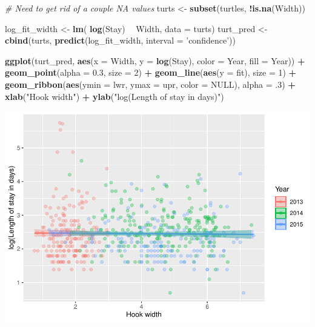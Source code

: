 \documentclass[
]{book}
\newenvironment{Shaded}{\begin{snugshade}}{\end{snugshade}}
\newcommand{\CommentTok}[1]{\textcolor[rgb]{0.56,0.35,0.01}{\textit{#1}}}
\newcommand{\DataTypeTok}[1]{\textcolor[rgb]{0.13,0.29,0.53}{#1}}
\newcommand{\DecValTok}[1]{\textcolor[rgb]{0.00,0.00,0.81}{#1}}
\newcommand{\FloatTok}[1]{\textcolor[rgb]{0.00,0.00,0.81}{#1}}
\newcommand{\KeywordTok}[1]{\textcolor[rgb]{0.13,0.29,0.53}{\textbf{#1}}}
\newcommand{\NormalTok}[1]{#1}
\newcommand{\OperatorTok}[1]{\textcolor[rgb]{0.81,0.36,0.00}{\textbf{#1}}}
\newcommand{\OtherTok}[1]{\textcolor[rgb]{0.56,0.35,0.01}{#1}}
\newcommand{\StringTok}[1]{\textcolor[rgb]{0.31,0.60,0.02}{#1}}
\begin{document}
\begin{Shaded}
\begin{Highlighting}[]
\CommentTok{# Need to get rid of a couple NA values}
\NormalTok{turts <-}\StringTok{ }\KeywordTok{subset}\NormalTok{(turtles, }\OperatorTok{!}\KeywordTok{is.na}\NormalTok{(Width))}

\NormalTok{log_fit_width <-}\StringTok{ }\KeywordTok{lm}\NormalTok{( }\KeywordTok{log}\NormalTok{(Stay) }\OperatorTok{~}\StringTok{ }\NormalTok{Width, }\DataTypeTok{data =}\NormalTok{ turts)}
\NormalTok{turt_pred <-}\StringTok{ }\KeywordTok{cbind}\NormalTok{(turts, }\KeywordTok{predict}\NormalTok{(log_fit_width, }\DataTypeTok{interval =} \StringTok{'confidence'}\NormalTok{))}

\KeywordTok{ggplot}\NormalTok{(turt_pred, }\KeywordTok{aes}\NormalTok{(}\DataTypeTok{x =}\NormalTok{ Width, }\DataTypeTok{y =} \KeywordTok{log}\NormalTok{(Stay), }\DataTypeTok{color =}\NormalTok{ Year, }\DataTypeTok{fill =}\NormalTok{ Year)) }\OperatorTok{+}
\StringTok{  }\KeywordTok{geom_point}\NormalTok{(}\DataTypeTok{alpha =} \FloatTok{0.3}\NormalTok{, }\DataTypeTok{size =} \DecValTok{2}\NormalTok{) }\OperatorTok{+}
\StringTok{  }\KeywordTok{geom_line}\NormalTok{(}\KeywordTok{aes}\NormalTok{(}\DataTypeTok{y =}\NormalTok{ fit), }\DataTypeTok{size =} \DecValTok{1}\NormalTok{) }\OperatorTok{+}
\StringTok{  }\KeywordTok{geom_ribbon}\NormalTok{(}\KeywordTok{aes}\NormalTok{(}\DataTypeTok{ymin =}\NormalTok{ lwr, }\DataTypeTok{ymax =}\NormalTok{ upr, }\DataTypeTok{color =} \OtherTok{NULL}\NormalTok{), }\DataTypeTok{alpha =} \FloatTok{.3}\NormalTok{) }\OperatorTok{+}
\StringTok{  }\KeywordTok{xlab}\NormalTok{(}\StringTok{"Hook width"}\NormalTok{) }\OperatorTok{+}
\StringTok{  }\KeywordTok{ylab}\NormalTok{(}\StringTok{"log(Length of stay in days)"}\NormalTok{)}
\end{Highlighting}
\end{Shaded}

\includegraphics{worstr_files/figure-latex/unnamed-chunk-241-1.pdf}
\end{document}
